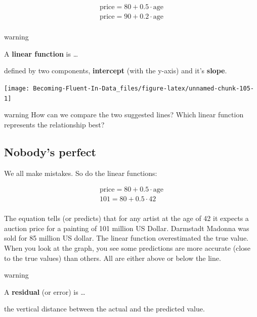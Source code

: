 \documentclass[
]{book}
\begin{document}
\[\begin{align}
\text{price} = 80 + 0.5 \cdot \text{age} \tag{Suggestion 1} \\
\text{price} = 90 + 0.2 \cdot \text{age} \tag{Suggestion 2} \\
\end{align}\]

\begin{infobox}warning

A \textbf{linear function} is \ldots{}

defined by two components, \textbf{intercept} (with the y-axis) and it's \textbf{slope}.

\end{infobox}

\begin{center}\texttt{[image: Becoming-Fluent-In-Data\_files/figure-latex/unnamed-chunk-105-1]} \end{center}

\begin{infobox}warning
How can we compare the two suggested lines? Which linear function represents the relationship best?

\end{infobox}

\hypertarget{nobodys-perfect}{%
\subsection{Nobody's perfect}\label{nobodys-perfect}}

We all make mistakes. So do the linear functions:

\[ \begin{align}
\text{price} = 80 + 0.5 \cdot \text{age} \tag{Suggestion 1} \\
101 = 80 + 0.5 \cdot 42 \tag{Calculation for Hohlbein} \\
\end{align}\]

The equation tells (or predicts) that for any artist at the age of 42 it expects a auction price for a painting of 101 million US Dollar. Darmstadt Madonna was sold for 85 million US dollar. The linear function overestimated the true value. When you look at the graph, you see some predictions are more accurate (close to the true values) than others. All are either above or below the line.

\begin{infobox}warning

A \textbf{residual} (or error) is \ldots{}

the vertical distance between the actual and the predicted value.

\end{infobox}
\end{document}
